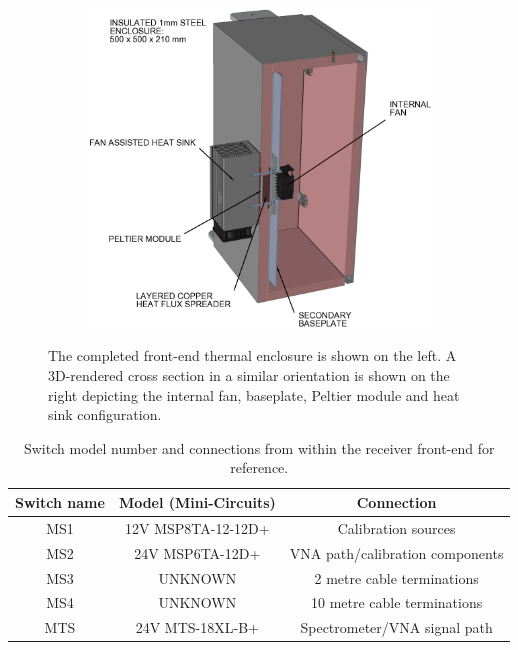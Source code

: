\begin{figure}
\begin{subfigure}{0.49\textwidth}
        \includegraphics[width=\textwidth]{enclosure_cross_section}
    \end{subfigure}
    \caption{The completed front-end thermal enclosure is shown on the left. A 3D-rendered cross section in a similar orientation is shown on the right depicting the internal fan, baseplate, Peltier module and heat sink configuration.}
    \label{fig:enclose_supp}
\end{figure}


\begin{table}
    \begin{center}
    \begin{tabular}{ |c|c|c| }
    \hline
    Switch name & Model (Mini-Circuits) & Connection \\
    \hline
    MS1 & 12V MSP8TA-12-12D+ & Calibration sources \\
    MS2 & 24V MSP6TA-12D+& VNA path/calibration components \\
    MS3 & UNKNOWN & 2 metre cable terminations \\
    MS4 & UNKNOWN & 10 metre cable terminations \\
    MTS & 24V MTS-18XL-B+ & Spectrometer/VNA signal path \\
    \hline
    \end{tabular}
    \caption{Switch model number and connections from within the receiver front-end for reference.}
    \label{tab:switches}
    \end{center}
\end{table}

